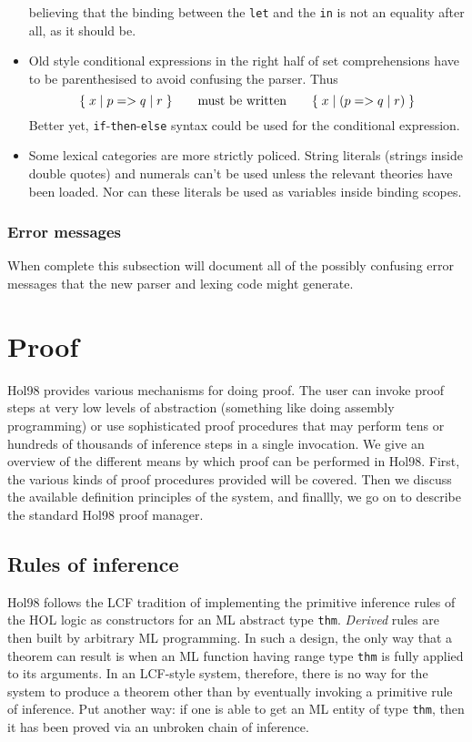 \documentclass[12pt,fleqn,a4paper]{report}
\begin{document}
\begin{itemize}
  believing that the binding between the \verb+let+ and the \verb+in+
  is not an equality after all, as it should be.
\item Old style conditional expressions in the right half of set
  comprehensions have to be parenthesised to avoid confusing the
  parser.  Thus \[
  \{ \; x \; | \; \mbox{$p \; {\tt =>} \; q \; {\tt |} \; r$} \; \}
   \qquad\mbox{must be written} \qquad
  \{ \; x \; | \; (\mbox{$p \; {\tt =>} \; q \; {\tt |} \; r$}) \; \}
  \] Better yet, {\tt if}-{\tt then}-{\tt else} syntax could be used
  for the conditional expression.
\item Some lexical categories are more strictly policed.  String
  literals (strings inside double quotes) and numerals can't be used
  unless the relevant theories have been loaded.  Nor can these
  literals be used as variables inside binding scopes.
\end{itemize}

\subsection{Error messages}

When complete this subsection will document all of the possibly
confusing error messages that the new parser and lexing code might
generate.

\chapter{Proof}

 Hol98 provides various mechanisms for doing proof. The user can invoke
 proof steps at very low levels of abstraction (something like doing
 assembly programming) or use sophisticated proof procedures that may
 perform tens or hundreds of thousands of inference steps in a single
 invocation. We give an overview of the different means by which proof
 can be performed in Hol98. First, the various kinds of proof procedures
 provided will be covered. Then we discuss the available definition
 principles of the system, and finallly, we go on to describe the
 standard Hol98 proof manager.

\section{Rules of inference}

 Hol98 follows the LCF tradition of implementing the primitive inference
 rules of the HOL logic as constructors for an ML abstract type
 \verb+thm+. {\it Derived\/} rules are then built by arbitrary ML
 programming. In such a design, the only way that a theorem can result is
 when an ML function having range type \verb+thm+ is fully applied to its
 arguments. In an LCF-style system, therefore, there is no way for the
 system to produce a theorem other than by eventually invoking a
 primitive rule of inference. Put another way: if one is able to get an
 ML entity of type \verb+thm+, then it has been proved via an unbroken
 chain of inference.
\end{document}

